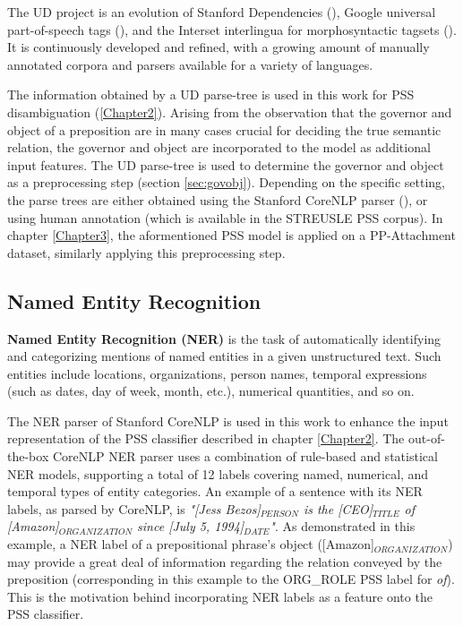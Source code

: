 The UD project is an evolution of Stanford Dependencies (\cite{de-marneffe-etal-14-universal}), Google universal part-of-speech tags (\cite{37072}), and the Interset interlingua for morphosyntactic tagsets (\cite{Zeman08ReusableTC}). It is continuously developed and refined, with a growing amount of manually annotated corpora and parsers available for a variety of languages. 

The information obtained by a UD parse-tree is used in this work for PSS disambiguation (\ref{Chapter2}). Arising from the observation that the governor and object of a preposition are in many cases crucial for deciding the true semantic relation, the governor and object are incorporated to the model as additional input features. The UD parse-tree is used to determine the governor and object as a preprocessing step (section \ref{sec:govobj}). Depending on the specific setting, the parse trees are either obtained using the Stanford CoreNLP parser (\cite{manning14stanford}), or using human annotation (which is available in the STREUSLE PSS corpus). In chapter \ref{Chapter3}, the aformentioned PSS model is applied on a PP-Attachment dataset, similarly applying this preprocessing step.

\subsection{Named Entity Recognition}
\textbf{Named Entity Recognition (NER)} is the task of automatically identifying and categorizing mentions of named entities in a given unstructured text. Such entities include locations, organizations, person names, temporal expressions (such as dates, day of week, month, etc.), numerical quantities, and so on.

The NER parser of Stanford CoreNLP is used in this work to enhance the input representation of the PSS classifier described in chapter \ref{Chapter2}. The out-of-the-box CoreNLP NER parser uses a combination of rule-based and statistical NER models, supporting a total of 12 labels covering named, numerical, and temporal types of entity categories. An example of a sentence with its NER labels, as parsed by CoreNLP, is \emph{"[Jess Bezos]$_{PERSON}$ is the [CEO]$_{TITLE}$ of [Amazon]$_{ORGANIZATION}$ since [July 5, 1994]$_{DATE}$"}. As demonstrated in this example, a NER label of a prepositional phrase's object ([Amazon]$_{ORGANIZATION}$) may provide a great deal of information regarding the relation conveyed by the preposition (corresponding in this example to the ORG\_ROLE PSS label for \emph{of}). This is the motivation behind incorporating NER labels as a feature onto the PSS classifier.

